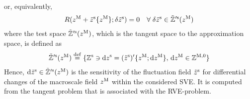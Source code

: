 \documentclass[12pt,a4paper]{article}
\renewcommand{\Box}{\mdlgwhtsquare}
\begin{document}
or, equivalently, 
\begin{align}
\label{eq:A6b} R(z^{\mathrm{M}} + \tilde z^{\mathrm{s}}\{z^{\mathrm{M}}\}; \delta\tilde{z}^{\mathrm{s}}) = 0\quad \forall\;\delta \tilde{z}^{\mathrm{s}}\in\tilde{\mathbb{Z}}'^{\mathrm{s}}(z^{\mathrm{M}})
\end{align}
where the test space $\tilde{\mathbb{Z}}'^{\mathrm{s}}(z^{\mathrm{M}})$, which is the tangent space to the approximation space, is defined as
\begin{align}
    \tilde{\mathbb{Z}}'^{\mathrm{s}}(z^{\mathrm{M}})\overset{\mathrm{def}}{=}\{\mathbb{Z}^{\mathrm{s}}\ni \operatorname{d \!} z^{\mathrm{s}} = (\tilde{z}^{\mathrm{s}})'\{z^{\mathrm{M}};\operatorname{d \!} z^{\mathrm{M}}\},\,
    \operatorname{d \!} z^{\mathrm{M}}\in \mathbb{Z}^{\mathrm{M},0}\}
\label{eq:A6c}
\end{align}
Hence, $\operatorname{d \!} \tilde{z}^{\mathrm{s}}\in\tilde{\mathbb{Z}}'^{\mathrm{s}}(z^{\mathrm{M}})$ is the sensitivity of the fluctuation field $\tilde{z}^{\mathrm{s}}$ for differential changes of the macroscale field $z^{\mathrm{M}}$ within the considered SVE.
It is computed from the tangent problem that is associated with the RVE-problem.
\end{document}
